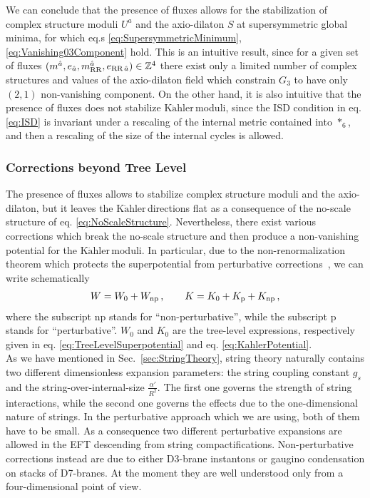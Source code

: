 \documentclass[12pt,a4paper]{book}
\newcommand{\Kahler}{\ensuremath{\text{K}\ddot{\text{a}}\text{hler}\,}}
\begin{document}
We can conclude that the presence of fluxes allows for the stabilization of complex structure moduli $U^a$ and the axio-dilaton $S$ at supersymmetric global minima, for which eq.s \eqref{eq:SupersymmetricMinimum}, \eqref{eq:Vanishing03Component} hold. This is an intuitive result, since for a given set of fluxes $(m^{\hat{a}}, e_{\hat{a}}, m_{\rm RR}^{\hat{a}}, e_{\text{RR}\, \hat{a}}) \in \mathbb{Z}^4$ there exist only a limited number of complex structures and values of the axio-dilaton field which constrain $G_3$ to have only $(2,1)$ non-vanishing component. On the other hand, it is also intuitive that the presence of fluxes does not stabilize \Kahler moduli, since the ISD condition in eq. \eqref{eq:ISD} is invariant under a rescaling of the internal metric contained into $*_6$, and then a rescaling of the size of the internal cycles is allowed.

\subsubsection{Corrections beyond Tree Level}
\label{sssec:CorrectionsToTreeLevel}

The presence of fluxes allows to stabilize complex structure moduli and the axio-dilaton, but it leaves the \Kahler directions flat as a consequence of the no-scale structure of eq. \eqref{eq:NoScaleStructure}. Nevertheless, there exist various corrections which break the no-scale structure and then produce a non-vanishing potential for the \Kahler moduli. In particular, due to the non-renormalization theorem which protects the superpotential from perturbative corrections~\cite{dine:1986vd, Burgess:2005jx, Becker:2006ks}, we can write schematically
\begin{align}
\label{eq:SchematicRenormalization}
W = W_0 + W_{\rm np}\,, \qquad K = K_0 + K_{\rm p} + K_{\rm np} \,,
\end{align}
where the subscript np stands for ``non-perturbative'', while the subscript p stands for ``perturbative''. $W_0$ and $K_0$ are the tree-level expressions, respectively given in eq. \eqref{eq:TreeLevelSuperpotential} and eq. \eqref{eq:KahlerPotential}.\\

As we have mentioned in Sec.~\ref{sec:StringTheory}, string theory naturally contains two different dimensionless expansion parameters: the string coupling constant $g_s$ and the string-over-internal-size $\frac{\alpha'}{R^2}$. The first one governs the strength of string interactions, while the second one governs the effects due to the one-dimensional nature of strings. In the perturbative approach which we are using, both of them have to be small. As a consequence two different perturbative expansions are allowed in the EFT descending from string compactifications. Non-perturbative corrections instead are due to either D3-brane instantons or gaugino condensation on stacks of D7-branes. At the moment they are well understood only from a four-dimensional point of view.\\
\end{document}
